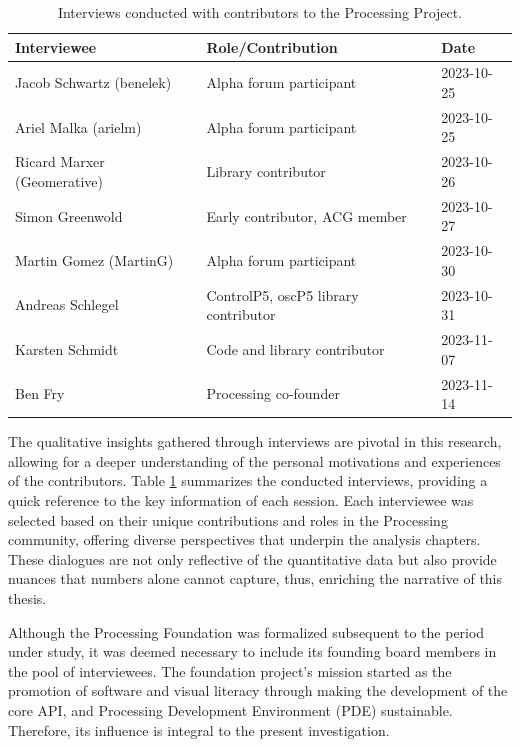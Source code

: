   \begin{table}[ht]
    \begin{adjustbox}{center}
    \begin{tabular}{lll}
    \hline
    Interviewee & Role/Contribution & Date \\ \hline
    Jacob Schwartz (benelek) & Alpha forum participant & 2023-10-25 \\
    Ariel Malka (arielm) & Alpha forum participant & 2023-10-25 \\
    Ricard Marxer (Geomerative) & Library contributor & 2023-10-26 \\
    Simon Greenwold & Early contributor, ACG member & 2023-10-27 \\
    Martin Gomez (MartinG) & Alpha forum participant & 2023-10-30 \\
    Andreas Schlegel & ControlP5, oscP5 library contributor & 2023-10-31 \\
    Karsten Schmidt & Code and library contributor & 2023-11-07 \\
    Ben Fry & Processing co-founder & 2023-11-14 \\
    \hline
    \end{tabular}
\end{adjustbox}

    \caption{Interviews conducted with contributors to the Processing Project.}
    \label{tab:interviews}

\end{table}
    
The qualitative insights gathered through interviews are pivotal in this research, allowing for a deeper understanding of the personal motivations and experiences of the contributors. Table \ref{tab:interviews} summarizes the conducted interviews, providing a quick reference to the key information of each session. Each interviewee was selected based on their unique contributions and roles in the Processing community, offering diverse perspectives that underpin the analysis chapters. These dialogues are not only reflective of the quantitative data but also provide nuances that numbers alone cannot capture, thus, enriching the narrative of this thesis.

  Although the Processing Foundation was formalized subsequent to the period under study, it was deemed necessary to include its founding board members in the pool of interviewees. The foundation project’s mission started as the promotion of software and visual literacy through making the development of the core API, and Processing Development Environment (PDE) sustainable. Therefore, its influence is integral to the present investigation.\parencite{robertsProcessingFoundationForm2013}
  
